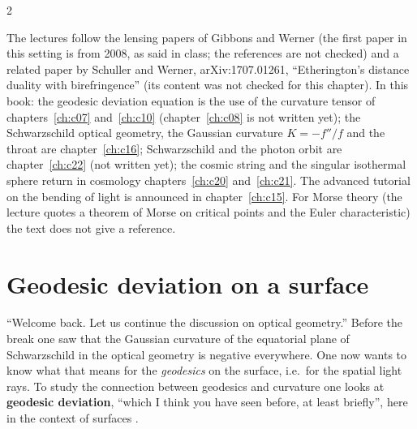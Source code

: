 \begin{paracol}{2}
\begin{reading}
The lectures follow the lensing papers of Gibbons and Werner (the first paper in this setting is from 2008, as said in class; the references are not checked) and a related paper by Schuller and Werner, arXiv:1707.01261, ``Etherington's distance duality with birefringence'' (its content was not checked for this chapter). In this book: the geodesic deviation equation is the use of the curvature tensor of chapters~\ref{ch:c07} and~\ref{ch:c10} (chapter~\ref{ch:c08} is not written yet); the Schwarzschild optical geometry, the Gaussian curvature $K=-f''/f$ and the throat are chapter~\ref{ch:c16}; Schwarzschild and the photon orbit are chapter~\ref{ch:c22} (not written yet); the cosmic string and the singular isothermal sphere return in cosmology chapters~\ref{ch:c20} and~\ref{ch:c21}. The advanced tutorial on the bending of light is announced in chapter~\ref{ch:c15}. For Morse theory (the lecture quotes a theorem of Morse on critical points and the Euler characteristic) the text does not give a reference.
\end{reading}

\section{Geodesic deviation on a surface}\label{sec:c17-deviation}

``Welcome back. Let us continue the discussion on optical geometry.'' Before the break one saw that the Gaussian curvature of the equatorial plane of Schwarzschild in the optical geometry is negative everywhere. One now wants to know what that means for the \emph{geodesics} on the surface, i.e.\ for the spatial light rays. To study the connection between geodesics and curvature one looks at \textbf{geodesic deviation}, ``which I think you have seen before, at least briefly'', here in the context of surfaces .


\end{paracol}
